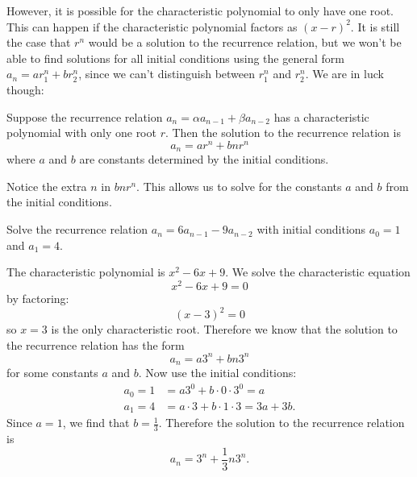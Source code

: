 \documentclass[11pt,]{book}
\theoremstyle{ptxplainnotitle}
\theoremstyle{ptxplaintitle}
\theoremstyle{ptxdefinitionnotitle}
\theoremstyle{ptxdefinitiontitle}
\theoremstyle{ptxdefinitionnotitle}
\theoremstyle{ptxdefinitiontitle}
\theoremstyle{ptxdefinitionnotitle}
\theoremstyle{ptxdefinitiontitle}
\theoremstyle{ptxdefinitiontitlenonumber}
\theoremstyle{ptxdefinitiontitlenonumber}
\numberwithin{equation}{chapter}
\newcommand{\amp}{&}
\begin{document}
\par
\hypertarget{p-466}{}%
However, it is possible for the characteristic polynomial to only have one root. This can happen if the characteristic polynomial factors as \((x - r)^2\). It is still the case that \(r^n\) would be a solution to the recurrence relation, but we won't be able to find solutions for all initial conditions using the general form \(a_n = ar_1^n + br_2^n\), since we can't distinguish between \(r_1^n\) and \(r_2^n\). We are in luck though:%
\begin{assemblage}\label{asmb_char-rep-roots}
\hypertarget{p-467}{}%
Suppose the recurrence relation \(a_n = \alpha a_{n-1} + \beta a_{n-2}\) has a characteristic polynomial with only one root \(r\). Then the solution to the recurrence relation is%
\begin{equation*}
a_n = ar^n + bnr^n
\end{equation*}
where \(a\) and \(b\) are constants determined by the initial conditions.%
\end{assemblage}
\hypertarget{p-468}{}%
Notice the extra \(n\) in \(bnr^n\). This allows us to solve for the constants \(a\) and \(b\) from the initial conditions.%
\begin{example}\label{example-24}
\hypertarget{p-469}{}%
Solve the recurrence relation \(a_n = 6a_{n-1} - 9a_{n-2}\) with initial conditions \(a_0 = 1\) and \(a_1 = 4\).%
\par\smallskip%
\noindent\textbf{}\hypertarget{solution-70}{}\hypertarget{p-470}{}%
The characteristic polynomial is \(x^2 - 6x + 9\). We solve the characteristic equation%
\begin{equation*}
x^2 - 6x + 9 = 0
\end{equation*}
by factoring:%
\begin{equation*}
(x - 3)^2 = 0
\end{equation*}
so \(x =3\) is the only characteristic root. Therefore we know that the solution to the recurrence relation has the form%
\begin{equation*}
a_n = a 3^n + bn3^n
\end{equation*}
for some constants \(a\) and \(b\). Now use the initial conditions:%
\begin{align*}
a_0 = 1 \amp = a 3^0 + b\cdot 0 \cdot 3^0 = a\\
a_1 = 4 \amp = a\cdot 3 + b\cdot 1 \cdot3 = 3a + 3b.
\end{align*}
Since \(a = 1\), we find that \(b = \frac{1}{3}\). Therefore the solution to the recurrence relation is%
\begin{equation*}
a_n = 3^n + \frac{1}{3}n3^n.
\end{equation*}
%
\end{example}
\end{document}
